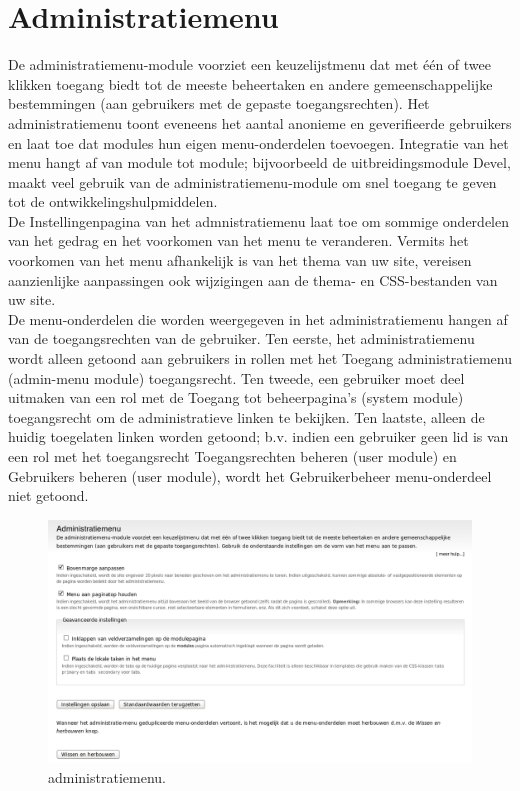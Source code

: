 \section{Administratiemenu} 
De administratiemenu-module  voorziet een
keuzelijstmenu dat met \'e\'en of twee klikken toegang biedt tot de meeste beheertaken en andere gemeenschappelijke bestemmingen (aan gebruikers met de gepaste 
toegangsrechten). Het administratiemenu toont eveneens het aantal anonieme en geverifieerde gebruikers 
en laat toe dat modules hun eigen menu-onderdelen toevoegen. Integratie van het menu hangt af van 
module tot module; bijvoorbeeld de uitbreidingsmodule Devel, maakt veel gebruik van de 
administratiemenu-module om snel toegang te geven tot de ontwikkelingshulpmiddelen.
\\
De Instellingenpagina van het admnistratiemenu laat toe om sommige onderdelen van het gedrag en het 
voorkomen van het menu te veranderen. Vermits het voorkomen van het menu afhankelijk is van het 
thema van uw site, vereisen aanzienlijke aanpassingen ook wijzigingen aan de thema- en CSS-bestanden 
van uw site. 
\\
De menu-onderdelen die worden weergegeven in het administratiemenu hangen af van de toegangsrechten 
van de gebruiker. Ten eerste, het administratiemenu wordt alleen getoond aan gebruikers in 
rollen met het Toegang administratiemenu (admin-menu module) toegangsrecht. Ten
tweede, een gebruiker moet deel uitmaken van een rol met de Toegang tot beheerpagina's (system module) 
toegangsrecht om de administratieve linken te bekijken. Ten laatste, alleen de huidig toegelaten 
linken worden getoond; b.v. indien een gebruiker geen lid is van een rol met het toegangsrecht 
Toegangsrechten beheren (user module) en Gebruikers beheren (user module), wordt het 
Gebruikerbeheer menu-onderdeel niet getoond.
\begin{figure}[!h]
    \centering
   \includegraphics[scale=0.3,angle=0]{administratiemenu}
   \caption{administratiemenu.\label{white}}
 \end{figure}

